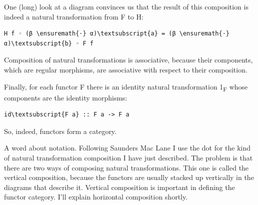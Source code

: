 \noindent
One (long) look at a diagram convinces us that the result of this
composition is indeed a natural transformation from F to H:

\begin{Verbatim}[commandchars=\\\{\}]
H f ◦ (β \ensuremath{⋅} α)\textsubscript{a} = (β \ensuremath{⋅} α)\textsubscript{b} ◦ F f
\end{Verbatim}

\begin{figure}[H]
\centering
{}
\end{figure}

\noindent
Composition of natural transformations is associative, because their
components, which are regular morphisms, are associative with respect to
their composition.

Finally, for each functor F there is an identity natural transformation
1\textsubscript{F} whose components are the identity morphisms:

\begin{Verbatim}[commandchars=\\\{\}]
id\textsubscript{F a} :: F a -> F a
\end{Verbatim}
So, indeed, functors form a category.

A word about notation. Following Saunders Mac Lane I use the dot for the
kind of natural transformation composition I have just described. The
problem is that there are two ways of composing natural transformations.
This one is called the vertical composition, because the functors are
usually stacked up vertically in the diagrams that describe it. Vertical
composition is important in defining the functor category. I'll explain
horizontal composition shortly.

\begin{figure}
\centering
{}
\end{figure}

